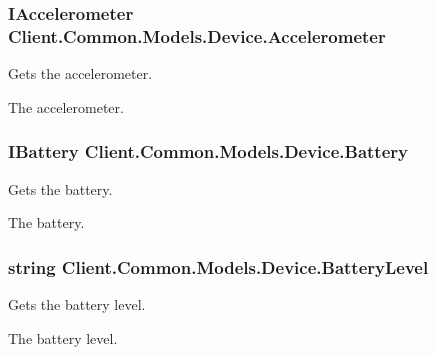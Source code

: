\subsubsection[{Accelerometer}]{\setlength{\rightskip}{0pt plus 5cm}I\+Accelerometer Client.\+Common.\+Models.\+Device.\+Accelerometer\hspace{0.3cm}{\ttfamily [get]}}\label{classClient_1_1Common_1_1Models_1_1Device_a850d4b4655dfaa9ce9467ba84a9d01c7}


Gets the accelerometer. 

The accelerometer.\hypertarget{classClient_1_1Common_1_1Models_1_1Device_a8c719b6d0548aabbbf37a811267ffc8e}{}
\subsubsection[{Battery}]{\setlength{\rightskip}{0pt plus 5cm}I\+Battery Client.\+Common.\+Models.\+Device.\+Battery\hspace{0.3cm}{\ttfamily [get]}}\label{classClient_1_1Common_1_1Models_1_1Device_a8c719b6d0548aabbbf37a811267ffc8e}


Gets the battery. 

The battery.\hypertarget{classClient_1_1Common_1_1Models_1_1Device_a1de2a8db856d258ad6987d81cdae9ea8}{}
\subsubsection[{Battery\+Level}]{\setlength{\rightskip}{0pt plus 5cm}string Client.\+Common.\+Models.\+Device.\+Battery\+Level\hspace{0.3cm}{\ttfamily [get]}}\label{classClient_1_1Common_1_1Models_1_1Device_a1de2a8db856d258ad6987d81cdae9ea8}


Gets the battery level. 

The battery level.\hypertarget{classClient_1_1Common_1_1Models_1_1Device_aa60310c6baea9e6d3953dc9b6cb469d9}{}

